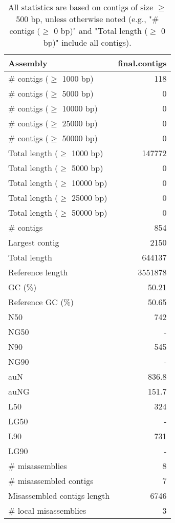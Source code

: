 \documentclass[12pt,a4paper]{article}
\begin{document}
\begin{table}[ht]
\begin{center}
\caption{All statistics are based on contigs of size $\geq$ 500 bp, unless otherwise noted (e.g., "\# contigs ($\geq$ 0 bp)" and "Total length ($\geq$ 0 bp)" include all contigs).}
\begin{tabular}{|l*{1}{|r}|}
\hline
Assembly & final.contigs \\ \hline
\# contigs ($\geq$ 1000 bp) & 118 \\ \hline
\# contigs ($\geq$ 5000 bp) & 0 \\ \hline
\# contigs ($\geq$ 10000 bp) & 0 \\ \hline
\# contigs ($\geq$ 25000 bp) & 0 \\ \hline
\# contigs ($\geq$ 50000 bp) & 0 \\ \hline
Total length ($\geq$ 1000 bp) & 147772 \\ \hline
Total length ($\geq$ 5000 bp) & 0 \\ \hline
Total length ($\geq$ 10000 bp) & 0 \\ \hline
Total length ($\geq$ 25000 bp) & 0 \\ \hline
Total length ($\geq$ 50000 bp) & 0 \\ \hline
\# contigs & 854 \\ \hline
Largest contig & 2150 \\ \hline
Total length & 644137 \\ \hline
Reference length & 3551878 \\ \hline
GC (\%) & 50.21 \\ \hline
Reference GC (\%) & 50.65 \\ \hline
N50 & 742 \\ \hline
NG50 & - \\ \hline
N90 & 545 \\ \hline
NG90 & - \\ \hline
auN & 836.8 \\ \hline
auNG & 151.7 \\ \hline
L50 & 324 \\ \hline
LG50 & - \\ \hline
L90 & 731 \\ \hline
LG90 & - \\ \hline
\# misassemblies & 8 \\ \hline
\# misassembled contigs & 7 \\ \hline
Misassembled contigs length & 6746 \\ \hline
\# local misassemblies & 3 \\ \hline

\end{tabular}
\end{center}
\end{table}
\end{document}
